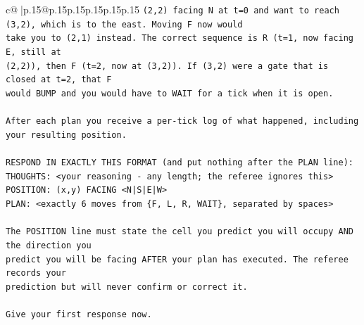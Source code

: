 \documentclass{article}
\begin{document}
{\begin{supertabular}{c@{$\;$}|p{.15\linewidth}@{}p{.15\linewidth}p{.15\linewidth}p{.15\linewidth}p{.15\linewidth}p{.15\linewidth}}
{{{\texttt{(2,2) facing N at t=0 and want to reach (3,2), which is to the east. Moving F now would} \\
\texttt{take you to (2,1) instead. The correct sequence is R (t=1, now facing E, still at} \\
\texttt{(2,2)), then F (t=2, now at (3,2)). If (3,2) were a gate that is closed at t=2, that F} \\
\texttt{would BUMP and you would have to WAIT for a tick when it is open.} \\
\\ 
\texttt{After each plan you receive a per{-}tick log of what happened, including your resulting position.} \\
\\ 
\texttt{RESPOND IN EXACTLY THIS FORMAT (and put nothing after the PLAN line):} \\
\texttt{THOUGHTS: <your reasoning {-} any length; the referee ignores this>} \\
\texttt{POSITION: (x,y) FACING <N|S|E|W>} \\
\texttt{PLAN: <exactly 6 moves from \{F, L, R, WAIT\}, separated by spaces>} \\
\\ 
\texttt{The POSITION line must state the cell you predict you will occupy AND the direction you} \\
\texttt{predict you will be facing AFTER your plan has executed. The referee records your} \\
\texttt{prediction but will never confirm or correct it.} \\
\\ 
\texttt{Give your first response now.} \\
            }
        }
    }
     \\ \\


\end{supertabular}}
\end{document}
